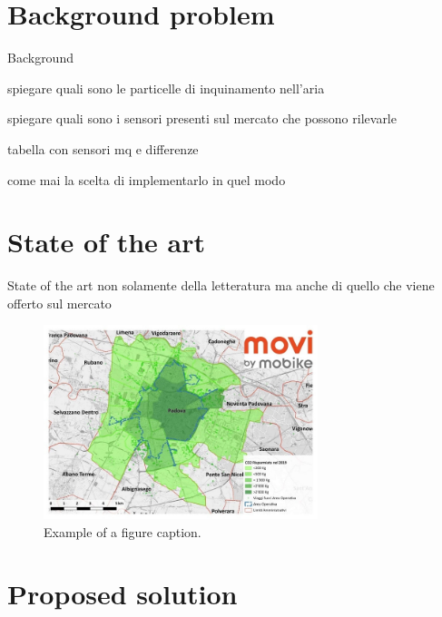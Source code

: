 \documentclass[conference]{IEEEtran}
\begin{document}
\section{Background problem}
Background

spiegare quali sono le particelle di inquinamento nell'aria

spiegare quali sono i sensori presenti sul mercato che possono rilevarle

tabella con sensori mq e differenze

come mai la scelta di implementarlo in quel modo

\section{State of the art}
	State of the art non solamente della letteratura ma anche di quello che viene offerto sul mercato
	
	\begin{figure}[htbp]
		\centerline{\includegraphics[width=8cm]{fig3.jpg}}
		\caption{Example of a figure caption.\cite{bibid}}
		\label{fig}
	\end{figure}


\section{Proposed solution}\label{solution}
	
\end{document}
